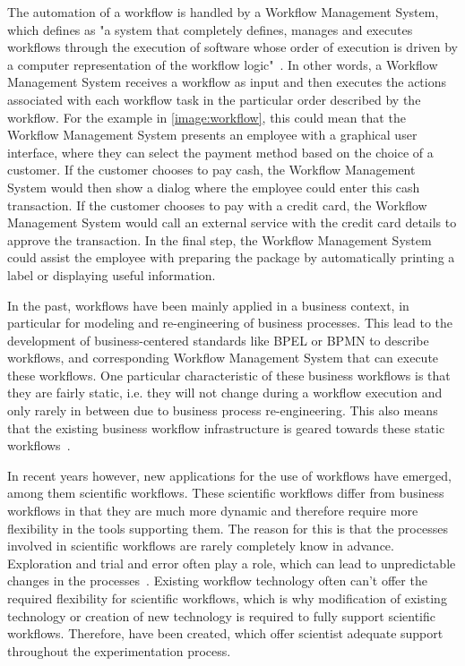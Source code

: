 The automation of a workflow is handled by a Workflow Management System, which \citeauthor*{workflow:referencemodel} defines as "a system that completely defines, manages and executes workflows through the execution of software whose order of execution is driven by a computer representation of the workflow logic"~\autocite{workflow:referencemodel}.
In other words, a Workflow Management System receives a workflow as input and then executes the actions associated with each workflow task in the particular order described by the workflow.
For the example in \autoref{image:workflow}, this could mean that the Workflow Management System presents an employee with a graphical user interface, where they can select the payment method based on the choice of a customer.
If the customer chooses to pay cash, the Workflow Management System would then show a dialog where the employee could enter this cash transaction.
If the customer chooses to pay with a credit card, the Workflow Management System would call an external service with the credit card details to approve the transaction.
In the final step, the Workflow Management System could assist the employee with preparing the package by automatically printing a label or displaying useful information.

In the past, workflows have been mainly applied in a business context, in particular for modeling and re-engineering of business processes.
This lead to the development of business-centered standards like BPEL or BPMN to describe workflows, and corresponding Workflow Management System that can execute these workflows.
One particular characteristic of these business workflows is that they are fairly static, i.e. they will not change during a workflow execution and only rarely in between due to business process re-engineering.
This also means that the existing business workflow infrastructure is geared towards these static workflows~\autocite{wasa}.

In recent years however, new applications for the use of workflows have emerged, among them scientific workflows.
These scientific workflows differ from business workflows in that they are much more dynamic and therefore require more flexibility in the tools supporting them.
The reason for this is that the processes involved in scientific workflows are rarely completely know in advance.
Exploration and trial and error often play a role, which can lead to unpredictable changes in the processes~\autocite{wasa}.
Existing workflow technology often can't offer the required flexibility for scientific workflows, which is why modification of existing technology or creation of new technology is required to fully support scientific workflows.
Therefore,  have been created, which offer scientist adequate support throughout the experimentation process.
